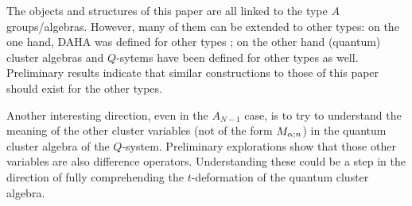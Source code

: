 The objects and structures of this paper are all linked to the type $A$ groups/algebras. However, many
of them can be extended to other types: on the one hand, DAHA was defined for other types \cite{Cheredbook};
on the other hand (quantum) cluster algebras and $Q$-sytems have been defined for other types as well. 
Preliminary results indicate that similar constructions to those of this paper should exist for the other types. 

Another interesting direction, even in the $A_{N-1}$ case, is to try to understand the meaning of the other
cluster variables (not of the form $M_{{\alpha};n}$) in the quantum cluster algebra of the $Q$-system. 
Preliminary explorations show that those
other variables are also difference operators. Understanding these
could be a step in the direction of fully comprehending the $t$-deformation of the quantum cluster algebra.

